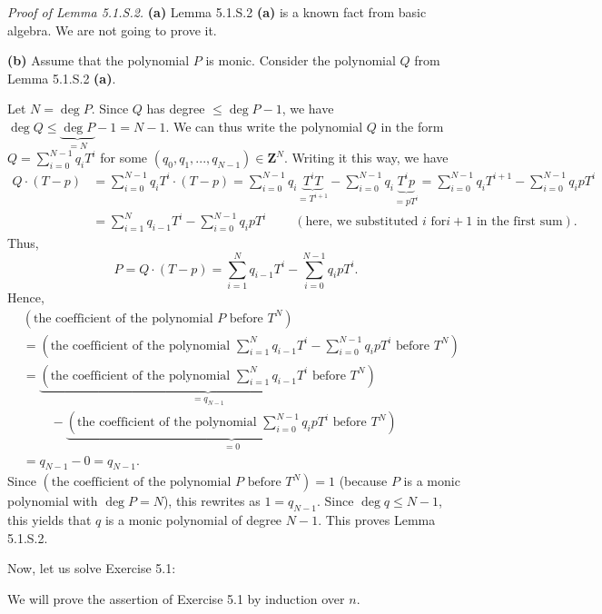 \documentclass[numbers=enddot,12pt,final,onecolumn,notitlepage]{scrartcl}%
\begin{document}
\textit{Proof of Lemma 5.1.S.2.} \textbf{(a)} Lemma 5.1.S.2 \textbf{(a)} is a
known fact from basic algebra. We are not going to prove it.

\textbf{(b)} Assume that the polynomial $P$ is monic. Consider the polynomial
$Q$ from Lemma 5.1.S.2 \textbf{(a)}.

Let $N=\deg P$. Since $Q$ has degree $\leq\deg P-1$, we have $\deg
Q\leq\underbrace{\deg P}_{=N}-1=N-1$. We can thus write the polynomial $Q$ in
the form $Q=\sum\limits_{i=0}^{N-1}q_{i}T^{i}$ for some $\left(  q_{0}%
,q_{1},...,q_{N-1}\right)  \in\mathbf{Z}^{N}$. Writing it this way, we have%
\begin{align*}
Q\cdot\left(  T-p\right)   &  =\sum\limits_{i=0}^{N-1}q_{i}T^{i}\cdot\left(
T-p\right)  =\sum\limits_{i=0}^{N-1}q_{i}\underbrace{T^{i}T}_{=T^{i+1}}%
-\sum\limits_{i=0}^{N-1}q_{i}\underbrace{T^{i}p}_{=pT^{i}}=\sum\limits_{i=0}%
^{N-1}q_{i}T^{i+1}-\sum\limits_{i=0}^{N-1}q_{i}pT^{i}\\
&  =\sum\limits_{i=1}^{N}q_{i-1}T^{i}-\sum\limits_{i=0}^{N-1}q_{i}%
pT^{i}\ \ \ \ \ \ \ \ \ \ \left(  \text{here, we substituted }i\text{ for
}i+1\text{ in the first sum}\right)  .
\end{align*}
Thus,%
\[
P=Q\cdot\left(  T-p\right)  =\sum\limits_{i=1}^{N}q_{i-1}T^{i}-\sum
\limits_{i=0}^{N-1}q_{i}pT^{i}.
\]
Hence,%
\begin{align*}
&  \left(  \text{the coefficient of the polynomial }P\text{ before }%
T^{N}\right) \\
&  =\left(  \text{the coefficient of the polynomial }\sum\limits_{i=1}%
^{N}q_{i-1}T^{i}-\sum\limits_{i=0}^{N-1}q_{i}pT^{i}\text{ before }T^{N}\right)
\\
&  =\underbrace{\left(  \text{the coefficient of the polynomial }%
\sum\limits_{i=1}^{N}q_{i-1}T^{i}\text{ before }T^{N}\right)  }_{=q_{N-1}}\\
&  \ \ \ \ \ \ \ \ \ \ -\underbrace{\left(  \text{the coefficient of the
polynomial }\sum\limits_{i=0}^{N-1}q_{i}pT^{i}\text{ before }T^{N}\right)
}_{=0}\\
&  =q_{N-1}-0=q_{N-1}.
\end{align*}
Since $\left(  \text{the coefficient of the polynomial }P\text{ before }%
T^{N}\right)  =1$ (because $P$ is a monic polynomial with $\deg P=N$), this
rewrites as $1=q_{N-1}$. Since $\deg q\leq N-1$, this yields that $q$ is a
monic polynomial of degree $N-1$. This proves Lemma 5.1.S.2.

Now, let us solve Exercise 5.1:

We will prove the assertion of Exercise 5.1 by induction over $n$.
\end{document}
